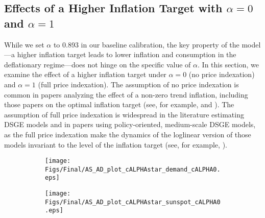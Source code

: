 \documentclass[11pt]{article}
\begin{document}
\begin{singlespace}

		\section{Effects of a Higher Inflation Target with $\alpha=0$ and $\alpha=1$}
		\label{A:Alpha}

		 While we set $\alpha$ to 0.893 in our baseline calibration, the key property of the model---a higher inflation target leads to lower inflation and consumption in the deflationary regime---does not hinge on the specific value of $\alpha$. In this section, we examine the effect of a higher inflation target under $\alpha=0$ (no price indexation) and $\alpha=1$ (full price indexation). The assumption of no price indexation is common in papers analyzing the effect of a non-zero trend inflation, including those papers on the optimal inflation target (see, for example, \citet{Ascari2004} and \citet{AscariCastelnuovoRossi2011}). The assumption of full price indexation is widespread in the literature estimating DSGE models and in papers using policy-oriented, medium-scale DSGE models, as the full price indexation make the dynamics of the loglinear version of those models invariant to the level of the inflation target (see, for example, \citet{SmetsWouters2007}).

		 \begin{figure}[h]
			\caption{AD and AS Curves: $\alpha = 0$} \label{fig:ASAD_alpha0}
	        \vspace{-1em}
			\begin{center}
				\begin{subfigure}[b]{0.4\textwidth}
					\centering		        	\texttt{[image: Figs/Final/AS\_AD\_plot\_cALPHAstar\_demand\_cALPHA0.eps]}
				\end{subfigure}
				\hspace{0.5cm}
				\begin{subfigure}[b]{0.4\textwidth}
					\centering					\texttt{[image: Figs/Final/AS\_AD\_plot\_cALPHAstar\_sunspot\_cALPHA0.eps]}
				\end{subfigure}
			\end{center}
		\end{figure}


\end{singlespace}
\end{document}
